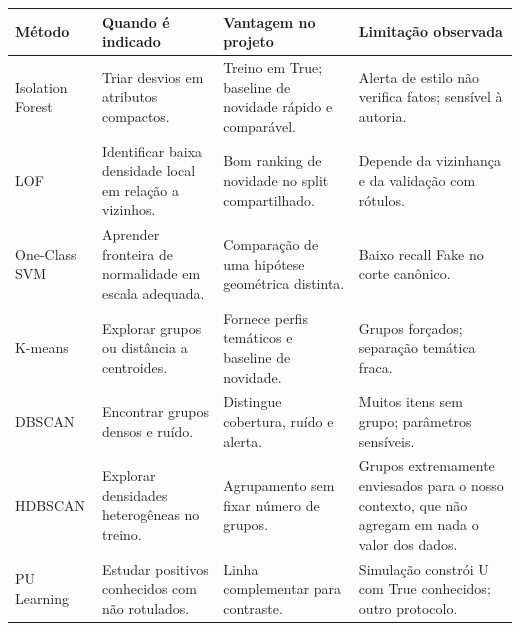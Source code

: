 \documentclass[
  brazilian,
  11pt,
]{article}
\newcounter{none} %
\begin{document}
{\def\LTcaptype{none} %
\begin{longtable}[]{@{}
  >{\raggedright\arraybackslash}p{}
  >{\raggedright\arraybackslash}p{}
  >{\raggedright\arraybackslash}p{}
  >{\raggedright\arraybackslash}p{}@{}}
\toprule\noalign{}
\begin{minipage}[b]{\linewidth}\raggedright
\textbf{Método}
\end{minipage} & \begin{minipage}[b]{\linewidth}\raggedright
\textbf{Quando é indicado}
\end{minipage} & \begin{minipage}[b]{\linewidth}\raggedright
\textbf{Vantagem no projeto}
\end{minipage} & \begin{minipage}[b]{\linewidth}\raggedright
\textbf{Limitação observada}
\end{minipage} \\
\midrule\noalign{}
\endhead
\bottomrule\noalign{}
\endlastfoot
Isolation Forest & Triar desvios em atributos compactos. & Treino em True; baseline de novidade rápido e comparável. & Alerta de estilo não verifica fatos; sensível à autoria. \\
LOF & Identificar baixa densidade local em relação a vizinhos. & Bom ranking de novidade no split compartilhado. & Depende da vizinhança e da validação com rótulos. \\
One-Class SVM & Aprender fronteira de normalidade em escala adequada. & Comparação de uma hipótese geométrica distinta. & Baixo recall Fake no corte canônico. \\
K-means & Explorar grupos ou distância a centroides. & Fornece perfis temáticos e baseline de novidade. & Grupos forçados; separação temática fraca. \\
DBSCAN & Encontrar grupos densos e ruído. & Distingue cobertura, ruído e alerta. & Muitos itens sem grupo; parâmetros sensíveis. \\
HDBSCAN & Explorar densidades heterogêneas no treino. & Agrupamento sem fixar número de grupos. & Grupos extremamente enviesados para o nosso contexto, que não agregam em nada o valor dos dados. \\
PU Learning & Estudar positivos conhecidos com não rotulados. & Linha complementar para contraste. & Simulação constrói U com True conhecidos; outro protocolo. \\
\end{longtable}
}
\end{document}
